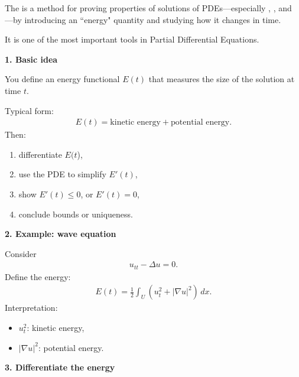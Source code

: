 \documentclass[12pt,a4paper]{report}
\begin{document}
\begin{description}
\newpage
	\item {}


The  is a method for proving properties of solutions of PDEs—especially , , and —by introducing an ``energy" quantity and studying how it changes in time.

It is one of the most important tools in Partial Differential Equations.

\begin{description}

\item \textbf{1. Basic idea}

You define an energy functional $E(t)$ that measures the size of the solution at time $t$.

Typical form:
\begin{align*}
E(t)=\text{kinetic energy}+\text{potential energy}.
\end{align*}
Then:
\begin{enumerate}
\item differentiate $E(t$),
\item use the PDE to simplify $E'(t)$,
\item show $E'(t)\le 0$, or $E'(t)=0$,
\item conclude bounds or uniqueness.
\end{enumerate}

\item \textbf{2. Example: wave equation}

Consider
\begin{align*}
u_{tt}-\Delta u=0.
\end{align*}
Define the energy:
\begin{align*}
E(t)=\frac12\int_U \left(u_t^2+|\nabla u|^2\right)\,dx.
\end{align*}
Interpretation:
\begin{itemize}
    \item $u_t^2$: kinetic energy,
    \item $|\nabla u|^2$: potential energy.
\end{itemize}

\item \textbf{3. Differentiate the energy}


\end{description}
\end{description}
\end{document}
